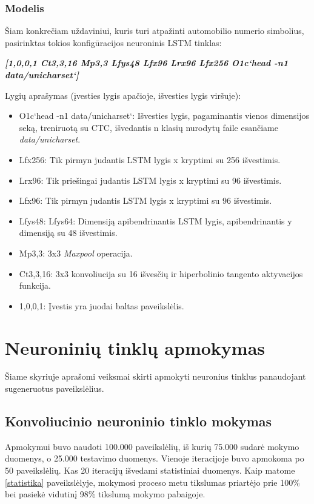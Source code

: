 \documentclass{VUMIFInfBakalaurinis}
\begin{document}
\subsubsection{Modelis}
Šiam konkrečiam uždaviniui, kuris turi atpažinti automobilio numerio simbolius, pasirinktas tokios konfigūracijos neuroninis LSTM tinklas:

\textbf{\textit{[1,0,0,1 Ct3,3,16 Mp3,3 Lfys48 Lfx96 Lrx96 Lfx256 O1c`head -n1 data/unicharset`]}}

Lygių aprašymas (įvesties lygis apačioje, išvesties lygis viršuje):

\begin{itemize}[itemsep=0.5pt]
  \item O1c`head -n1 data/unicharset`: Išvesties lygis, pagaminantis vienos dimensijos seką, treniruotą su CTC, išvedantis n klasių nurodytų faile esančiame \textit{data/unicharset}.
  \item Lfx256: Tik pirmyn judantis LSTM lygis x kryptimi su 256 išvestimis.
  \item Lrx96: Tik priešingai judantis LSTM lygis x kryptimi su 96 išvestimis.
  \item Lfx96: Tik pirmyn judantis LSTM lygis x kryptimi su 96 išvestimis.
  \item Lfys48: Lfys64: Dimensiją apibendrinantis LSTM lygis, apibendrinantis y dimensiją su 48 išvestimis.
  \item Mp3,3: 3x3 \textit{Maxpool} operacija.
  \item Ct3,3,16: 3x3 konvoliucija su 16 išvesčių ir hiperbolinio tangento aktyvacijos funkcija.
  \item 1,0,0,1: Įvestis yra juodai baltas paveikslėlis.
\end{itemize}

\pagebreak
\section{Neuroninių tinklų apmokymas}
Šiame skyriuje aprašomi veiksmai skirti apmokyti neuronius tinklus panaudojant sugeneruotus paveikslėlius.

\subsection{Konvoliucinio neuroninio tinklo mokymas}
Apmokymui buvo naudoti 100.000 paveikslėlių, iš kurių 75.000 sudarė mokymo duomenys, o 25.000 testavimo duomenys.
Vienoje iteracijoje buvo apmokoma po 50 paveikslėlių. Kas 20 iteracijų išvedami statistiniai duomenys. Kaip matome \ref{statistika} paveikslėlyje,
mokymosi proceso metu tikslumas priartėjo prie 100\% bei pasiekė vidutinį 98\% tikslumą mokymo pabaigoje.
\end{document}
